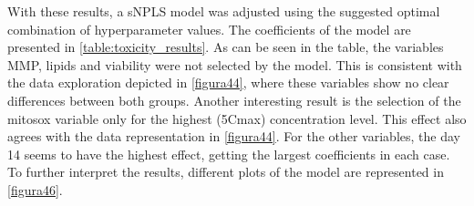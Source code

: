With these results, a sNPLS model was adjusted using the suggested optimal combination of hyperparameter values. The coefficients of the model are presented in \autoref{table:toxicity_results}. As can be seen in the table, the variables MMP, lipids and viability were not selected by the model. This is consistent with the data exploration depicted in \autoref{figura44}, where these variables show no clear differences between both groups. Another interesting result is the selection of the mitosox variable only for the highest (5Cmax) concentration level. This effect also agrees with the data representation in \autoref{figura44}. For the other variables, the day 14 seems to have the highest effect, getting the largest coefficients in each case. To further interpret the results, different plots of the model are represented in \autoref{figura46}.

